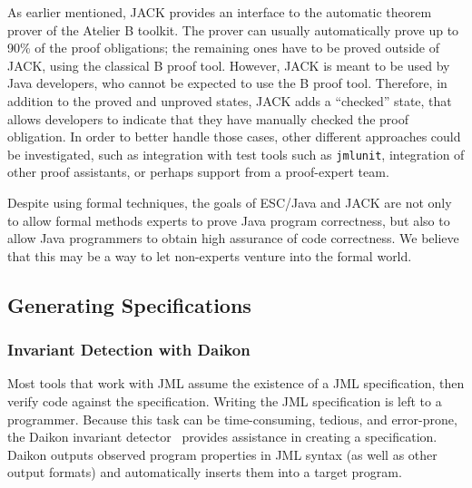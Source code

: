 As earlier mentioned, JACK provides an interface to the automatic
theorem prover of the Atelier B toolkit. The prover can usually
automatically prove up to 90\% of the proof obligations; the remaining
ones have to be proved outside of JACK, using the classical B proof
tool.  However, JACK is meant to be used by Java developers, who
cannot be expected to use the B proof tool.  Therefore, in addition to
the proved and unproved states, JACK adds a ``checked'' state, that
allows developers to indicate that they have manually checked the
proof obligation. In order to better handle those cases, other
different approaches could be investigated, such as integration with
test tools such as {\tt jmlunit}, integration of other proof
assistants, or perhaps support from a proof-expert team.


\vspace{0.5cm}

Despite using formal techniques, the goals of ESC/Java and JACK are not
only to allow formal methods experts to prove Java program
correctness, but also to allow Java programmers to obtain high
assurance of code correctness.  We believe that this may be a way to
let non-experts venture into the formal world.

\subsection{Generating Specifications} 

\subsubsection{Invariant Detection with Daikon}
\label{daikon}

Most tools that work with JML assume the existence of a JML
specification, then verify code against the specification.  Writing
the JML specification is left to a programmer.  Because this task can
be time-consuming, tedious, and error-prone, the Daikon invariant
detector~\cite{Ernst2000:PhD,ErnstCGN2001:TSE} provides assistance in
creating a specification.  Daikon outputs observed program properties
in JML syntax (as well as other output formats) and automatically inserts
them into a target program.

